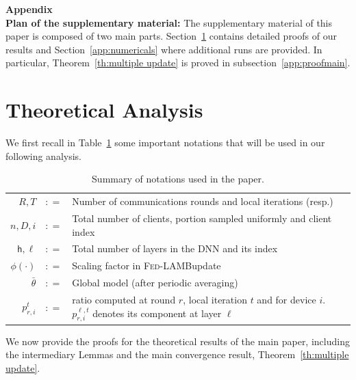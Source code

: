 \documentclass[11pt]{article}
\newcommand{\eqdef}{\mathrel{\mathop:}=}
\def\tot{\mathsf{h}}
\newcommand{\algo}{\textsc{Fed-LAMB}}
\begin{document}
\newpage
\appendix


\noindent\textbf{\LARGE Appendix}\\
 
 
\textbf{Plan of the supplementary material:}
The supplementary material of this paper is composed of two main parts.
Section~\ref{app:proofs} contains detailed proofs of our results and Section~\ref{app:numericals} where additional runs are provided.
In particular, Theorem~\ref{th:multiple update} is proved in subsection~\ref{app:proofmain}.



\section{Theoretical Analysis}\label{app:proofs}

We first recall in Table~\ref{tab:notationsapp} some important notations that will be used in our following analysis.
\begin{table}[H]
\begin{center}%
\begin{tabular}{r c p{12cm} }
\toprule
$R, T$ & $\eqdef$ &  Number of communications rounds and local iterations (resp.)\\
$n, D, i$ & $\eqdef$ &  Total number of clients, portion sampled uniformly and client index \\
$\tot, \ell$ & $\eqdef$ &  Total number of layers in the DNN and its index \\
$\phi(\cdot)$ & $\eqdef$ &  Scaling factor in \algo update\\
$\bar{\theta}$ & $\eqdef$ &  Global model (after periodic averaging)\\
$p_{r,i}^{t}$ & $\eqdef$ &  ratio computed at round $r$, local iteration $t$ and for device $i$. $p_{r,i}^{\ell,t}$ denotes its component at layer $\ell$\\
\bottomrule
\end{tabular}
\end{center}
\caption{Summary of notations used in the paper.}
\label{tab:notationsapp}
\end{table}


We now provide the proofs for the theoretical results of the main paper, including the intermediary Lemmas and the main convergence result, Theorem~\ref{th:multiple update}.
\end{document}
